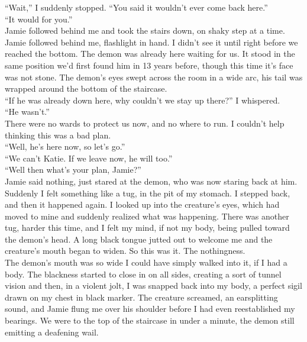 \documentclass[a5paper]{scrartcl}
\begin{document}
\enquote{Wait,} I suddenly stopped. \enquote{You said it wouldn't ever come back here.}\\


\enquote{It would for you.} \\


Jamie followed behind me and took the stairs down, on shaky step at a time. Jamie followed behind me, flashlight in hand. I didn't see it until right before we reached the bottom. The demon was already here waiting for us. It stood in the same position we'd first found him in 13 years before, though this time it's face was not stone. The demon's eyes swept across the room in a wide arc, his tail was wrapped around the bottom of the staircase.\\


\enquote{If he was already down here, why couldn't we stay up there?} I whispered.\\


\enquote{He wasn't.}\\


There were no wards to protect us now, and no where to run. I couldn't help thinking this was a bad plan.\\


\enquote{Well, he's here now, so let's go.}\\


\enquote{We can't Katie. If we leave now, he will too.}\\


\enquote{Well then what's your plan, Jamie?}\\


Jamie said nothing, just stared at the demon, who was now staring back at him. Suddenly I felt something like a tug, in the pit of my stomach. I stepped back, and then it happened again. I looked up into the creature's eyes, which had moved to mine and suddenly realized what was happening. There was another tug, harder this time, and I felt my mind, if not my body, being pulled toward the demon's head. A long black tongue jutted out to welcome me and the creature's mouth began to widen. So this was it. The nothingness.\\


The demon's mouth was so wide I could have simply walked into it, if I had a body. The blackness started to close in on all sides, creating a sort of tunnel vision and then, in a violent jolt, I was snapped back into my body, a perfect sigil drawn on my chest in black marker. The creature screamed, an earsplitting sound, and Jamie flung me over his shoulder before I had even reestablished my bearings. We were to the top of the staircase in under a minute, the demon still emitting a deafening wail. \\
\end{document}
